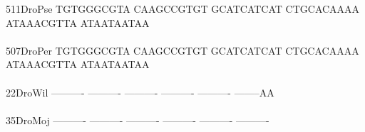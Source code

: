 \documentclass[11pt,twoside,reqno,a4paper]{article}
\begin{document}
{511\hspace*{2\charwidth}DroPse	TGTGGGCGTA	CAAGCCGTGT	GCATCATCAT	CTGCACAAAA	ATAAACGTTA	ATAATAATAA	\\
\hspace*{5\charwidth}\hspace*{7\charwidth}\hspace*{1\charwidth}\hspace*{1\charwidth}\hspace*{1\charwidth}\hspace*{1\charwidth}\hspace*{1\charwidth}\hspace*{1\charwidth}\\
507\hspace*{2\charwidth}DroPer	TGTGGGCGTA	CAAGCCGTGT	GCATCATCAT	CTGCACAAAA	ATAAACGTTA	ATAATAATAA	\\
\hspace*{5\charwidth}\hspace*{7\charwidth}\hspace*{1\charwidth}\hspace*{1\charwidth}\hspace*{1\charwidth}\hspace*{1\charwidth}\hspace*{1\charwidth}\hspace*{1\charwidth}\\
22\hspace*{3\charwidth}DroWil	----------	----------	----------	----------	----------	--------AA	\\
\hspace*{5\charwidth}\hspace*{7\charwidth}\hspace*{1\charwidth}\hspace*{1\charwidth}\hspace*{1\charwidth}\hspace*{1\charwidth}\hspace*{1\charwidth}\hspace*{1\charwidth}\\
35\hspace*{3\charwidth}DroMoj	----------	----------	----------	----------	----------	----------	\\
\hspace*{5\charwidth}\hspace*{7\charwidth}\hspace*{1\charwidth}\hspace*{1\charwidth}\hspace*{1\charwidth}\hspace*{1\charwidth}\hspace*{1\charwidth}\hspace*{1\charwidth}\\
}
\end{document}
